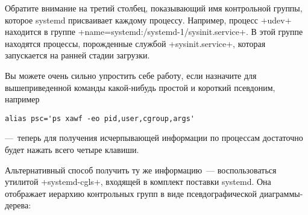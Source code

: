 \documentclass[10pt,oneside,a4paper]{article}
\begin{document}
Обратите внимание на третий столбец, показывающий имя контрольной группы,
которое systemd присваивает каждому процессу. Например, процесс +udev+
находится в группе +name=systemd:/systemd-1/sysinit.service+. В этой группе
находятся процессы, порожденные службой +sysinit.service+, которая запускается
на ранней стадии загрузки.

Вы можете очень сильно упростить себе работу, если назначите для
вышеприведенной команды какой-нибудь простой и короткий псевдоним, например 
\begin{Verbatim}
alias psc='ps xawf -eo pid,user,cgroup,args'
\end{Verbatim}
---~теперь для получения исчерпывающей информации по процессам достаточно будет
нажать всего четыре клавиши.

Альтернативный способ получить ту же информацию~--- воспользоваться утилитой
+systemd-cgls+, входящей в комплект поставки systemd. Она отображает иерархию
контрольных групп в виде псевдографической диаграммы-дерева: 
\end{document}
